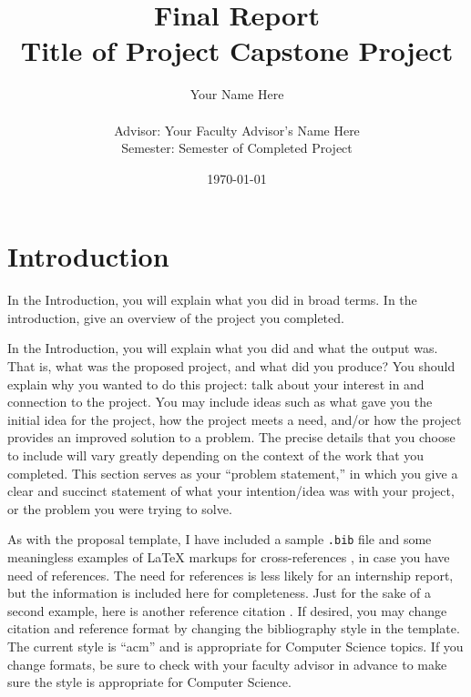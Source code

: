 \documentclass[titlepage]{article}
\begin{document}
\title{Final Report\\Title of Project Capstone Project} 
\author{Your Name Here\\\\Advisor: Your Faculty Advisor's Name Here\\Semester: Semester of Completed Project} 
\date{\today}
\maketitle


\section{Introduction}
In the Introduction, you will explain what you did in broad terms. In the introduction, give an overview of the project you completed.

In the Introduction, you will explain what you did and what the output was. That is, what was the proposed project, and what did you produce? You should explain why you wanted to do this project: talk about your interest in and connection to the project. You may include ideas such as what gave you the initial idea for the project, how the project meets a need, and/or how the project provides an improved solution to a problem. The precise details that you choose to include will vary greatly depending on the context of the work that you completed. This section serves as your ``problem statement,'' in which you give a clear and succinct statement of what your intention/idea was with your project, or the problem you were trying to solve.

As with the proposal template, I have included a sample \texttt{.bib} file and some meaningless examples of \LaTeX{ }markups for cross-references \cite{pholdee_hybrid_2017}, in case you have need of references. The need for references is less likely for an internship report, but the information is included here for completeness. Just for the sake of a second example, here is another reference citation \cite{hadka_large-scale_2015}. If desired, you may change citation and reference format by changing the bibliography style in the template. The current style is ``acm'' and is appropriate for Computer Science topics. If you change formats, be sure to check with your faculty advisor in advance to make sure the style is appropriate for Computer Science.
\end{document}
